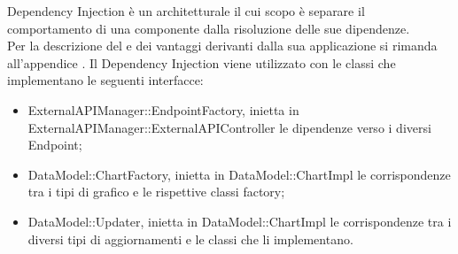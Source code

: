 			Dependency Injection è un  architetturale il cui scopo è separare il comportamento di una componente dalla risoluzione delle sue dipendenze.\\
			Per la descrizione del  e dei vantaggi derivanti dalla sua applicazione si rimanda all'appendice .
				Il  Dependency Injection viene utilizzato con le classi che implementano le seguenti interfacce:
				\begin{itemize}
					\item ExternalAPIManager::EndpointFactory, inietta in ExternalAPIManager::ExternalAPIController le dipendenze verso i diversi Endpoint;
					\item DataModel::ChartFactory, inietta in DataModel::ChartImpl le  corrispondenze tra i tipi di grafico e le rispettive classi factory;
					\item DataModel::Updater, inietta in DataModel::ChartImpl le corrispondenze tra i diversi tipi di aggiornamenti e le classi che li implementano.
				\end{itemize}
				
